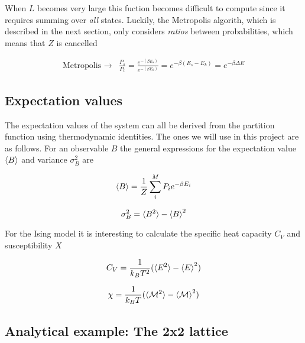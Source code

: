 \documentclass[11pt]{article}
\begin{document}
\begin{flushleft}

When $L$ becomes very large this fuction becomes difficult to compute since it requires summing over \textit{all} states. Luckily, the Metropolis algorith, which is described in the next section, only considers \textit{ratios} between probabilities, which means that $Z$ is cancelled

\begin{align*}
\text{Metropolis } \rightarrow  &\frac{P_s}{P_t} = \frac{e^{-(\beta E_s)}}{e^{-(\beta E_k)}}
= e^{-\beta(E_s - E_k)}
= e^{-\beta \Delta E} 
\end{align*}

\end{flushleft}

\subsection*{Expectation values}
\begin{flushleft}

The expectation values of the system can all be derived from the partition function using thermodynamic identities. The ones we will use in this project are as follows. For an observable $B$ the general expressions for the expectation value $\braket{B}$ and variance $\sigma_B^2$ are

\begin{equation}
\braket{B} = \frac{1}{Z} \sum_i^M P_i e^{- \beta E_i}
\end{equation} 

\begin{equation}
\sigma_B^2 = \braket{B^2} - \braket{B}^2 
\end{equation}

For the Ising model it is interesting to calculate the specific heat capacity $C_V$ and susceptibility $X$

\begin{equation}
C_V = \frac{1}{k_B T^2} (\braket{E^2} - \braket{E}^2)
\end{equation}

\begin{equation}\label{X exp}
\chi = \frac{1}{k_B T} (\braket{\mathcal{M}^2} - \braket{\mathcal{M}}^2)
\end{equation}

\end{flushleft}

\subsection{Analytical example: The 2x2 lattice}
\end{document}
